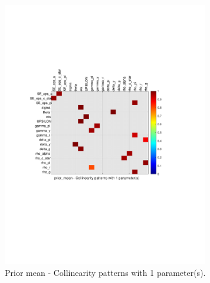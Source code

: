 
\begin{figure}[H]
\centering 
\includegraphics[width=0.8\textwidth]{nash/identification/nash_ident_collinearity_prior_mean_1}
\caption{Prior mean  - Collinearity patterns with 1 parameter(s).}\label{Fig:collinearity:prior_mean:1_pars}
\end{figure}

